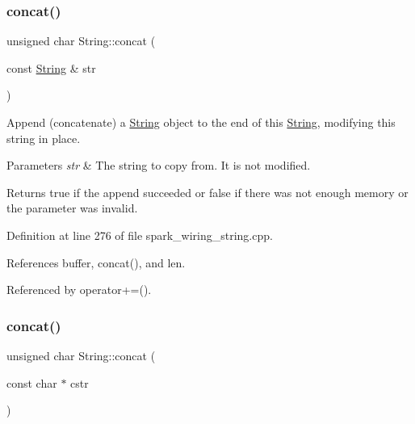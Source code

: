 \mbox{\label{class_string_a63f64f8a3da37d4570ce7b2ceec5bd2b}} 
\subsubsection{\texorpdfstring{concat()}{concat()}\hspace{0.1cm}{\footnotesize\ttfamily [1/12]}}
{\footnotesize\ttfamily unsigned char String\+::concat (\begin{DoxyParamCaption}\item[{const \hyperlink{class_string}{String} \&}]{str }\end{DoxyParamCaption})}



Append (concatenate) a \hyperlink{class_string}{String} object to the end of this \hyperlink{class_string}{String}, modifying this string in place. 


\begin{DoxyParams}{Parameters}
{\em str} & The string to copy from. It is not modified.\\
\hline
\end{DoxyParams}
\begin{DoxyReturn}{Returns}
true if the append succeeded or false if there was not enough memory or the parameter was invalid. 
\end{DoxyReturn}


Definition at line 276 of file spark\+\_\+wiring\+\_\+string.\+cpp.



References buffer, concat(), and len.



Referenced by operator+=().

\mbox{\label{class_string_a5477edc378d55f57bb6572217e562c7a}} 
\subsubsection{\texorpdfstring{concat()}{concat()}\hspace{0.1cm}{\footnotesize\ttfamily [2/12]}}
{\footnotesize\ttfamily unsigned char String\+::concat (\begin{DoxyParamCaption}\item[{const char $\ast$}]{cstr }\end{DoxyParamCaption})}



